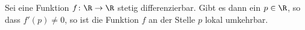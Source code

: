 \begin{exercise} %
  Sei eine Funktion $f \colon \R \to \R$ stetig differenzierbar. Gibt es dann
  ein $p \in \R$, so dass $f'(p) \neq 0$, so ist die Funktion $f$ an der
  Stelle $p$ lokal umkehrbar.
\end{exercise}

